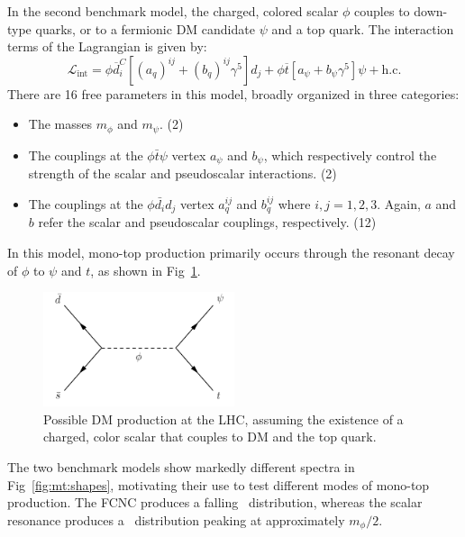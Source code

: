 In the second benchmark model, the charged, colored scalar $\phi$ couples to down-type quarks, or to a fermionic DM candidate $\psi$ and a top quark.
The interaction terms of the Lagrangian is given by:
\begin{equation}
    \mathcal{L}_\text{int} = \phi\overline{{d}}_i^C[(a_{q})^{ij}+(b_{q})^{ij}\gamma^5]{d}_j+\phi\overline{{t}}[a_{\psi}+b_{\psi}\gamma^5]\psi+\text{h.c.}
\end{equation}
There are 16 free parameters in this model, broadly organized in three categories:
\begin{itemize}
    \item The masses $m_\phi$ and $m_\psi$. (2)
    \item The couplings at the $\phi \bar{t} \psi$ vertex $a_\psi$ and $b_\psi$, which respectively control the strength of the scalar and pseudoscalar interactions. (2)
    \item The couplings at the $\phi \bar{d_i} d_j$ vertex $a_q^{ij}$ and $b_q^{ij}$ where $i,j=1,2,3$. Again, $a$ and $b$ refer the scalar and pseudoscalar couplings, respectively. (12)
\end{itemize}
In this model, mono-top production primarily occurs through the resonant decay of $\phi$ to $\psi$ and $t$, as shown in Fig~\ref{fig:mt:resdiag}.

\begin{figure}[!ht]
    \begin{center}
        \includegraphics[width=0.5\textwidth]{figures/monotop/diagrams/resonant.pdf}
        \caption{Possible DM production at the LHC, assuming the existence of a charged, color scalar that couples to DM and the top quark.}
        \label{fig:mt:resdiag}
    \end{center}
\end{figure}

The two benchmark models show markedly different spectra in Fig~\ref{fig:mt:shapes}, motivating their use to test different modes of mono-top production.
The FCNC produces a falling \ptmiss~distribution, whereas the scalar resonance produces a \ptmiss~distribution peaking at approximately $m_\phi / 2$. 


